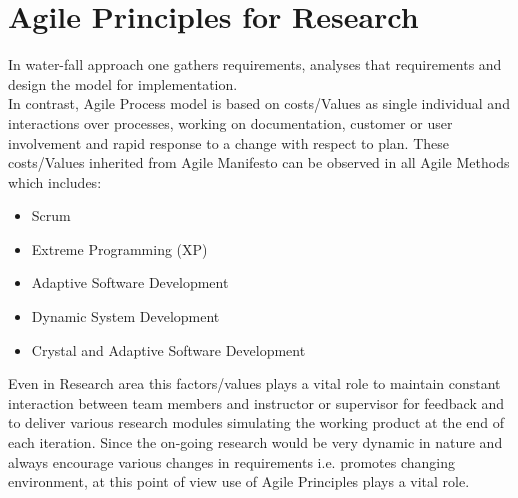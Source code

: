 

\section{Agile Principles for Research}\label{sec:agile-research-principles}
In water-fall approach one gathers requirements, analyses that requirements and design the model for implementation.
\\ In contrast, Agile Process model is based on costs/Values as single individual and interactions over processes, working on documentation, customer or user involvement and rapid response to a change with respect to plan.
These costs/Values inherited from Agile Manifesto can be observed in all Agile Methods which includes:
\begin{itemize}
	\item Scrum
	\item Extreme Programming (XP)
	\item Adaptive Software Development
	\item Dynamic System Development
	\item Crystal and Adaptive Software Development
\end{itemize}

Even in Research area this factors/values plays a vital role to maintain constant interaction between team members and instructor or supervisor for feedback and to deliver various research modules simulating the working product at the end of each iteration.
Since the on-going research would be very dynamic in nature and always encourage various changes in requirements i.e. promotes changing environment, at this point of view use of Agile Principles plays a vital role.

